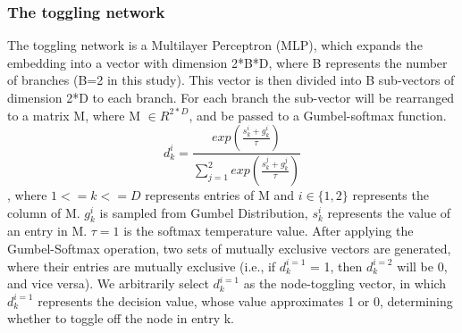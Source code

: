 \documentclass[lettersize,journal]{IEEEtran}
\begin{document}
\subsubsection{The toggling network}
\label{ssec:toglNet}
The toggling network is a Multilayer Perceptron (MLP), which expands the embedding into a vector with dimension 2*B*D, where B represents the number of branches (B=2 in this study). This vector is then divided into B sub-vectors of dimension 2*D to each branch. For each branch the sub-vector will be rearranged to a matrix M, where M $\in R^{2*D}$, and be passed to a Gumbel-softmax function. 
\[
d^{i}_{k}=\frac{exp(\frac{s^{i}_{k}+g^{i}_{k}}{\tau})}{\sum_{j=1}^{2}exp(\frac{s^{j}_{k}+g^{j}_{k}}{\tau})}
\] 
, where $ 1 <= k <= D$ represents entries of M and $i\in \{1,2\}$ represents the column of M. $g^{i}_{k}$ is sampled from Gumbel Distribution, $ s^{i}_{k} $ represents the value of an entry in M. $\tau=1$ is the softmax temperature value. After applying the Gumbel-Softmax operation, two sets of mutually exclusive vectors are generated, where their entries are mutually exclusive (i.e., if $d^{i=1}_{k}$ = 1, then $d^{i=2}_{k}$ will be 0, and vice versa). We arbitrarily select ${d^{i=1}_{k}}$ as the node-toggling vector, in which $d^{i=1}_{k}$ represents the decision value, whose value approximates 1 or 0, determining whether to toggle off the node in entry k. 
\end{document}
